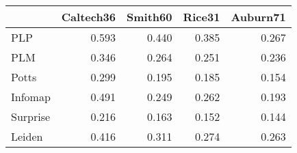 \begin{tabular}{lrrrr}
\toprule
{} & Caltech36 & Smith60 & Rice31 & Auburn71 \\
\midrule
PLP      &     0.593 &   0.440 &  0.385 &    0.267 \\
PLM      &     0.346 &   0.264 &  0.251 &    0.236 \\
Potts    &     0.299 &   0.195 &  0.185 &    0.154 \\
Infomap  &     0.491 &   0.249 &  0.262 &    0.193 \\
Surprise &     0.216 &   0.163 &  0.152 &    0.144 \\
Leiden   &     0.416 &   0.311 &  0.274 &    0.263 \\
\bottomrule
\end{tabular}
